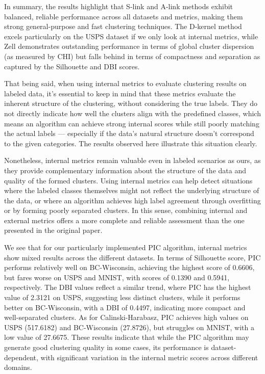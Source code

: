 \documentclass[
	10pt,
	parskip=half-,	
	paper=a4,
	english
	]{scrartcl}
\begin{document}
In summary, the results highlight that S-link and A-link methods exhibit balanced, reliable performance across all datasets and metrics, making them strong general-purpose and fast clustering techniques. The D-kernel method excels particularly on the USPS dataset if we only look at internal metrics, while Zell demonstrates outstanding performance in terms of global cluster dispersion (as measured by CHI) but falls behind in terms of compactness and separation as captured by the Silhouette and DBI scores.

That being said, when using internal metrics to evaluate clustering results on labeled data, it's essential to keep in mind that these metrics evaluate the inherent structure of the clustering, without considering the true labels. They do not directly indicate how well the clusters align with the predefined classes, which means an algorithm can achieve strong internal scores while still poorly matching the actual labels — especially if the data's natural structure doesn't correspond to the given categories. The results observed here illustrate this situation clearly.

Nonetheless, internal metrics remain valuable even in labeled scenarios as ours, as they provide complementary information about the structure of the data and quality of the formed clusters. Using internal metrics can help detect situations where the labeled classes themselves might not reflect the underlying structure of the data, or where an algorithm achieves high label agreement through overfitting or by forming poorly separated clusters. In this sense, combining internal and external metrics offers a more complete and reliable assessment than the one presented in the original paper.

We see that for our particularly implemented PIC algorithm, internal metrics show mixed results across the different datasets. In terms of Silhouette score, PIC performs relatively well on BC-Wisconsin, achieving the highest score of 0.6606, but fares worse on USPS and MNIST, with scores of 0.1390 and 0.5941, respectively. The DBI values reflect a similar trend, where PIC has the highest value of 2.3121 on USPS, suggesting less distinct clusters, while it performs better on BC-Wisconsin, with a DBI of 0.4497, indicating more compact and well-separated clusters. As for Calinski-Harabasz, PIC achieves high values on USPS (517.6182) and BC-Wisconsin (27.8726), but struggles on MNIST, with a low value of 27.6675. These results indicate that while the PIC algorithm may generate good clustering quality in some cases, its performance is dataset-dependent, with significant variation in the internal metric scores across different domains.
\end{document}

